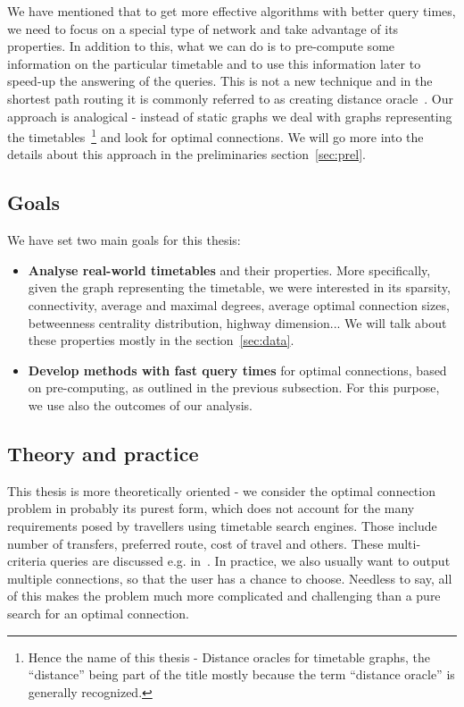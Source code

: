 	\noindent We have mentioned that to get more effective algorithms with better query times, we need to focus on a special type of network and take advantage of its properties. In addition to this, what we can do is to pre-compute some information on the particular timetable and to use this information later to speed-up the answering of the queries. This is not a new technique and in the shortest path routing it is commonly referred to as creating distance oracle~\cite{apxdo05}. Our approach is analogical - instead of static graphs we deal with graphs representing the timetables~\footnote{Hence the name of this thesis - Distance oracles for timetable graphs, the ``distance'' being part of the title mostly because the term ``distance oracle'' is generally recognized.} and look for optimal connections. We will go more into the details about this approach in the preliminaries section~\ref{sec:prel}.
	
\subsection{Goals}
	
	\noindent We have set two main goals for this thesis:
	\begin{itemize}
		\item \textbf{Analyse real-world timetables} and their properties. More specifically, given the graph representing the timetable, we were interested in its sparsity, connectivity, average and maximal degrees, average optimal connection sizes, betweenness centrality distribution, highway dimension... We will talk about these properties mostly in the section~\ref{sec:data}. 
		\item \textbf{Develop methods with fast query times} for optimal connections, based on pre-computing, as outlined in the previous subsection. For this purpose, we use also the outcomes of our analysis.
	\end{itemize}
	
\subsection{Theory and practice}

	\noindent This thesis is more theoretically oriented - we consider the optimal connection problem in probably its purest form, which does not account for the many requirements posed by travellers using timetable search engines. Those include number of transfers, preferred route, cost of travel and others. These multi-criteria queries are discussed e.g. in~\cite{timetablemodelsalgs07}. In practice, we also usually want to output multiple connections, so that the user has a chance to choose. Needless to say, all of this makes the problem much more complicated and challenging than a pure search for an optimal connection.
	
